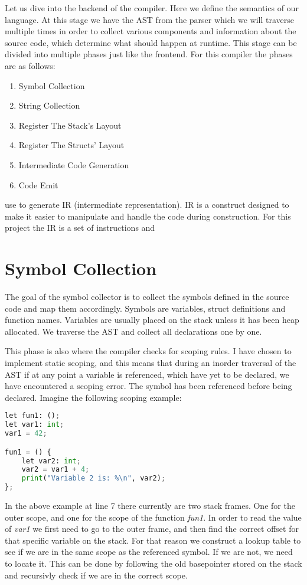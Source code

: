 Let us dive into the backend of the compiler. Here we define the semantics of our language. At this stage we have the AST from the parser which we will traverse multiple times in order to collect various components and information about the source code, which determine what should happen at runtime. This stage can be divided into multiple phases just like the frontend. For this compiler the phases are as follows: 
\begin{enumerate}
    \item Symbol Collection
    \item String Collection
    \item Register The Stack's Layout
    \item Register The Structs' Layout
    \item Intermediate Code Generation
    \item Code Emit
\end{enumerate}


use to generate IR (intermediate representation). IR is a construct designed to make it easier to manipulate and handle the code during construction. For this project the IR is a set of instructions and 

\section{Symbol Collection}
The goal of the symbol collector is to collect the symbols defined in the source code and map them accordingly. Symbols are variables, struct definitions and function names. Variables are usually placed on the stack unless it has been heap allocated. We traverse the AST and collect all declarations one by one. 

This phase is also where the compiler checks for scoping rules. I have chosen to implement static scoping, and this means that during an inorder traversal of the AST if at any point a variable is referenced, which have yet to be declared, we have encountered a scoping error. The symbol has been referenced before being declared. Imagine the following scoping example:

\begin{lstlisting}[language=Python,title=Static Scoping]
let fun1: ();
let var1: int;
var1 = 42;

fun1 = () {
    let var2: int;
    var2 = var1 + 4;
    print("Variable 2 is: %\n", var2);
};
\end{lstlisting}

In the above example at line 7 there currently are two stack frames. One for the outer scope, and one for the scope of the function \textit{fun1}. In order to read the value of \textit{var1} we first need to go to the outer frame, and then find the correct offset for that specific variable on the stack. For that reason we construct a lookup table to see if we are in the same scope as the referenced symbol. If we are not, we need to locate it. This can be done by following the old basepointer stored on the stack and recursivly check if we are in the correct scope.  

